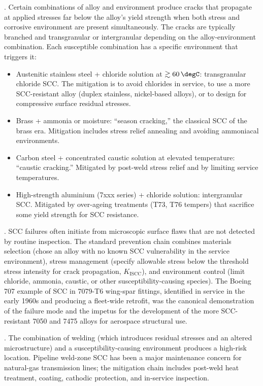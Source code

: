 . Certain combinations of
alloy and environment produce cracks that propagate at applied
stresses far below the alloy's yield strength when both stress and
corrosive environment are present simultaneously. The cracks are
typically branched and transgranular or intergranular depending on
the alloy-environment combination. Each susceptible combination has
a specific environment that triggers it:

\begin{itemize}[leftmargin=*]
\item Austenitic stainless steel + chloride solution at $\gtrsim
  60\,\degC$: transgranular chloride SCC. The mitigation is to avoid
  chlorides in service, to use a more SCC-resistant alloy (duplex
  stainless, nickel-based alloys), or to design for compressive
  surface residual stresses.
\item Brass + ammonia or moisture: ``season cracking,'' the classical
  SCC of the brass era. Mitigation includes stress relief
  annealing and avoiding ammoniacal environments.
\item Carbon steel + concentrated caustic solution at elevated
  temperature: ``caustic cracking.'' Mitigated by post-weld stress
  relief and by limiting service temperatures.
\item High-strength aluminium (7xxx series) + chloride solution:
  intergranular SCC. Mitigated by over-ageing treatments (T73, T76
  tempers) that sacrifice some yield strength for SCC resistance.
\end{itemize}

. SCC failures often initiate from
microscopic surface flaws that are not detected by routine
inspection. The standard prevention chain combines materials
selection (chose an alloy with no known SCC vulnerability in the
service environment), stress management (specify allowable stress
below the threshold stress intensity for crack propagation,
$K_{\text{ISCC}}$), and environment control (limit chloride, ammonia,
caustic, or other susceptibility-causing species). The Boeing 707
example of SCC in 7079-T6 wing-spar fittings, identified in service
in the early 1960s and producing a fleet-wide retrofit, was the
canonical demonstration of the failure mode and the impetus for the
development of the more SCC-resistant 7050 and 7475 alloys for
aerospace structural use.

. The combination of welding
(which introduces residual stresses and an altered microstructure)
and a susceptibility-causing environment produces a high-risk
location. Pipeline weld-zone SCC has been a major maintenance
concern for natural-gas transmission lines; the mitigation chain
includes post-weld heat treatment, coating, cathodic protection, and
in-service inspection.

